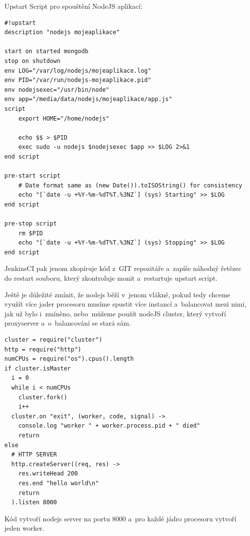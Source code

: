 \documentclass[a4paper,12pt,twoside,BCOR=10mm]{article}
\newenvironment{codeframe}{%
  \begin{Sbox} 
    \begin{minipage} 
      {\columnwidth-\leftmargin-\rightmargin-2\fboxsep-2\fboxrule-4pt} 
}{%

  \end{minipage} 
  \end{Sbox} 
  \begin{center} 
    \fcolorbox{black}{codeback}{\TheSbox} 
  \end{center} 
}
\begin{document}
Upstart Script pro spouštění NodeJS aplikací:
\begin{codeframe}
  \begin{verbatim}
#!upstart
description "nodejs mojeaplikace"

start on started mongodb
stop on shutdown
env LOG="/var/log/nodejs/mojeaplikace.log"
env PID="/var/run/nodejs-mojeaplikace.pid"
env nodejsexec="/usr/bin/node"
env app="/media/data/nodejs/mojeaplikace/app.js"
script
    export HOME="/home/nodejs"

    echo $$ > $PID
    exec sudo -u nodejs $nodejsexec $app >> $LOG 2>&1
end script

pre-start script
    # Date format same as (new Date()).toISOString() for consistency
    echo "[`date -u +%Y-%m-%dT%T.%3NZ`] (sys) Starting" >> $LOG
end script

pre-stop script
    rm $PID
    echo "[`date -u +%Y-%m-%dT%T.%3NZ`] (sys) Stopping" >> $LOG
end script
  \end{verbatim}
\end{codeframe}

JenkinsCI pak jenom zkopíruje kód z~GIT repozitáře a~zapíše náhodný řetězec do restart souboru, který zkontroluje monit a~restartuje upstart script.

Ještě je důležité zmínit, že nodejs běží v~jenom vlákně, pokud tedy chceme využít více jader procesoru musíme spustit více instancí a~balancovat mezi nimi, jak už bylo i~zmíněno, nebo~můžeme použít nodeJS cluster, který vytvoří proxyserver a~o~balancování se stará sám.\cite{prezNodeHuge}
\begin{codeframe}
  \begin{verbatim}
cluster = require("cluster")
http = require("http")
numCPUs = require("os").cpus().length
if cluster.isMaster
  i = 0
  while i < numCPUs
    cluster.fork()
    i++
  cluster.on "exit", (worker, code, signal) ->
    console.log "worker " + worker.process.pid + " died"
    return
else
  # HTTP SERVER
  http.createServer((req, res) ->
    res.writeHead 200
    res.end "hello world\n"
    return
  ).listen 8000
  \end{verbatim}
\end{codeframe}
Kód vytvoří nodejs server na portu 8000 a~pro každé jádro procesoru vytvoří jeden worker.\cite{prezNodeHuge}
\end{document}
